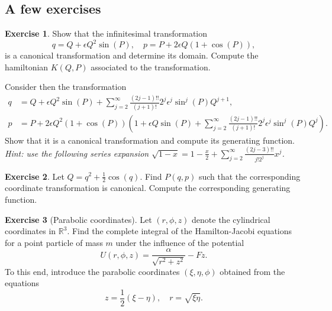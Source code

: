 \documentclass[english,fontsize=11pt,paper=b5]{scrbook}
\theoremstyle{definition}
\newtheorem{exercise}{Exercise}[chapter]
\begin{document}
    \subsection{A few exercises}
    \begin{exercise}
      Show that the infinitesimal transformation
      \begin{equation}
        q = Q + \epsilon Q^2 \sin(P), \quad
        p = P + 2\epsilon Q(1+\cos(P)),
      \end{equation}
      is a canonical transformation and determine its domain.
      Compute the hamiltonian $K(Q,P)$ associated to the transformation.

      Consider then the transformation
      \begin{align}
        q & = Q + \epsilon Q^2 \sin(P) + \sum_{j=2}^\infty \frac{(2j-1)!!}{(j+1)!}2^j \epsilon^j \sin^j(P) Q^{j+1}, \\
        p & = P + 2\epsilon Q^2\left(1+\cos(P)\right)\left(
          1 + \epsilon Q \sin(P) + \sum_{j=2}^\infty \frac{(2j-1)!!}{(j+1)!}2^j \epsilon^j \sin^j(P) Q^{j}
        \right).
        \end{align}
        Show that it is a canonical transformation and compute its generating function.\\
        \textit{Hint: use the following series expansion $\sqrt{1-x} = 1 - \frac{x}{2} + \sum_{j=2}^\infty \frac{(2j-3)!!}{j! 2^j} x^j$.}
      \end{exercise}

      \begin{exercise}
        Let $Q = q^2 + \frac12 \cos(q)$.
        Find $P(q,p)$ such that the corresponding coordinate transformation is canonical.
        Compute the corresponding generating function.
      \end{exercise}

      \begin{exercise}[Parabolic coordinates]
        Let $(r,\phi,z)$ denote the cylindrical coordinates in $\mathbb{R}^3$.
        Find the complete integral of the Hamilton-Jacobi equations for a point particle of mass $m$ under the influence of the potential
        \begin{equation}
          U(r,\phi,z) = \frac{\alpha}{\sqrt{r^2+z^2}} - F z.
        \end{equation}
        To this end, introduce the parabolic coordinates $(\xi, \eta, \phi)$ obtained from the equations
        \begin{equation}
          z = \frac 12(\xi - \eta), \quad
          r = \sqrt{\xi\eta}.
        \end{equation}
      \end{exercise}
\end{document}

